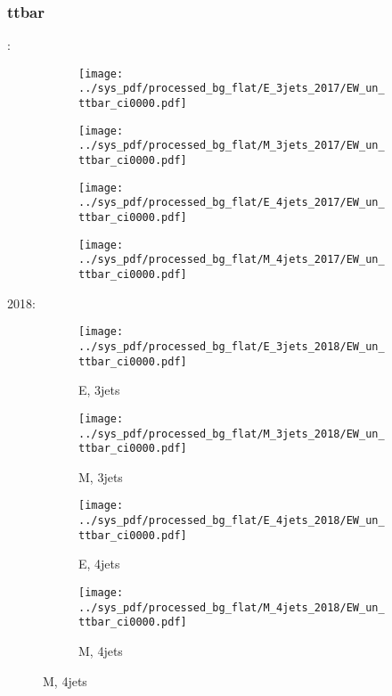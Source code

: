 \documentclass{beamer}
\begin{document}
\begin{frame}
\frametitle{ttbar}
\fontsize{5}{1}:
\begin{figure}
\centering
\begin{subfigure}[b]{0.24\textwidth}
\texttt{[image: ../sys\_pdf/processed\_bg\_flat/E\_3jets\_2017/EW\_un\_ttbar\_ci0000.pdf]}
\end{subfigure}
\begin{subfigure}[b]{0.24\textwidth}
\texttt{[image: ../sys\_pdf/processed\_bg\_flat/M\_3jets\_2017/EW\_un\_ttbar\_ci0000.pdf]}
\end{subfigure}
\begin{subfigure}[b]{0.24\textwidth}
\texttt{[image: ../sys\_pdf/processed\_bg\_flat/E\_4jets\_2017/EW\_un\_ttbar\_ci0000.pdf]}
\end{subfigure}
\begin{subfigure}[b]{0.24\textwidth}
\texttt{[image: ../sys\_pdf/processed\_bg\_flat/M\_4jets\_2017/EW\_un\_ttbar\_ci0000.pdf]}
\end{subfigure}
\end{figure}
2018:
\begin{figure}
\centering
\begin{subfigure}[b]{0.24\textwidth}
\texttt{[image: ../sys\_pdf/processed\_bg\_flat/E\_3jets\_2018/EW\_un\_ttbar\_ci0000.pdf]}
\captionsetup{font=tiny}
\caption{E, 3jets}
\end{subfigure}
\begin{subfigure}[b]{0.24\textwidth}
\texttt{[image: ../sys\_pdf/processed\_bg\_flat/M\_3jets\_2018/EW\_un\_ttbar\_ci0000.pdf]}
\captionsetup{font=tiny}
\caption{M, 3jets}
\end{subfigure}
\begin{subfigure}[b]{0.24\textwidth}
\texttt{[image: ../sys\_pdf/processed\_bg\_flat/E\_4jets\_2018/EW\_un\_ttbar\_ci0000.pdf]}
\captionsetup{font=tiny}
\caption{E, 4jets}
\end{subfigure}
\begin{subfigure}[b]{0.24\textwidth}
\texttt{[image: ../sys\_pdf/processed\_bg\_flat/M\_4jets\_2018/EW\_un\_ttbar\_ci0000.pdf]}
\captionsetup{font=tiny}
\caption{M, 4jets}
\end{subfigure}
\end{figure}
\end{frame}
\end{document}
